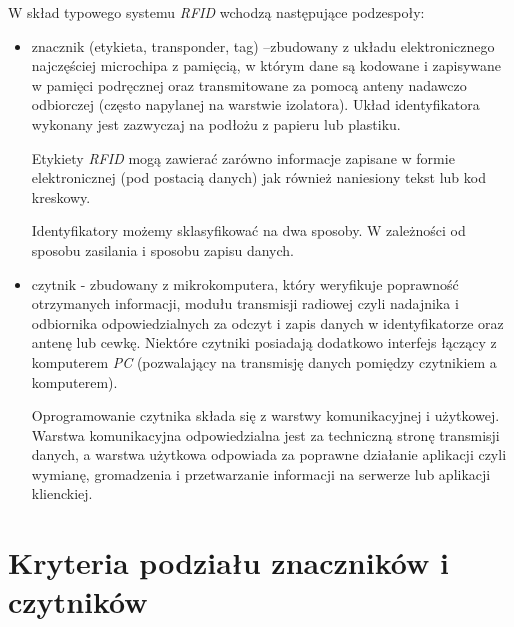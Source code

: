 \noindent  
\newline W skład typowego systemu \emph{RFID} wchodzą następujące podzespoły:
\begin{itemize}\setlength{\itemsep}{0pt}

	\item znacznik  (etykieta, transponder, tag) –zbudowany z układu elektronicznego najczęściej microchipa z pamięcią, w którym dane są  kodowane i zapisywane w pamięci podręcznej oraz transmitowane za pomocą anteny nadawczo odbiorczej (często napylanej na warstwie izolatora). Układ identyfikatora wykonany jest zazwyczaj na podłożu z papieru lub plastiku. 

	Etykiety \emph{RFID} mogą zawierać zarówno informacje zapisane w formie elektronicznej (pod postacią danych) jak również naniesiony tekst lub kod kreskowy. 

	Identyfikatory możemy sklasyfikować na dwa sposoby. W zależności od sposobu zasilania i sposobu zapisu danych. 

	\item czytnik - zbudowany z mikrokomputera, który weryfikuje poprawność otrzymanych informacji, modułu transmisji radiowej czyli nadajnika i odbiornika  odpowiedzialnych za odczyt i zapis danych w identyfikatorze oraz antenę lub cewkę. Niektóre czytniki posiadają dodatkowo interfejs łączący z komputerem \emph{PC} (pozwalający na transmisję danych pomiędzy czytnikiem a komputerem).
	
	Oprogramowanie czytnika składa się z warstwy komunikacyjnej i użytkowej. Warstwa komunikacyjna odpowiedzialna jest za techniczną stronę transmisji danych, a warstwa użytkowa odpowiada za poprawne działanie aplikacji czyli wymianę, gromadzenia i przetwarzanie informacji na serwerze lub aplikacji klienckiej.


\end{itemize}



\section{Kryteria podziału znaczników i czytników}


